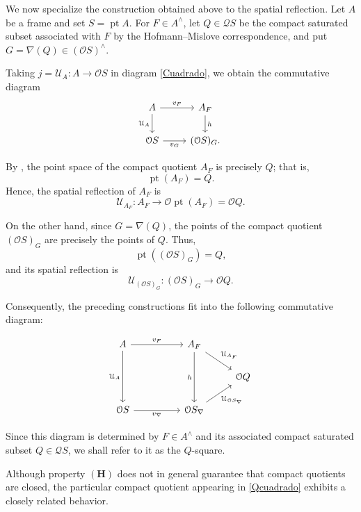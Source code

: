 \documentclass[11pt]{amsart}
\DeclareMathOperator{\pt}{pt}
\theoremstyle{plain}
\theoremstyle{definition}
\begin{document}
We now specialize the construction obtained above to the spatial reflection. Let \(A\) be a frame and set $S=\pt A$.
For \(F\in A^\wedge\), let \(Q\in\mathcal{Q}S\) be the compact
saturated subset associated with \(F\) by the Hofmann--Mislove
correspondence, and put $G=\nabla(Q)\in(\mathcal{O}S)^\wedge$.

Taking $j=\mathcal{U}_A\colon A\longrightarrow\mathcal{O}S$ in diagram \eqref{Cuadrado}, 
we obtain the commutative diagram
\[
\begin{tikzcd}
    A \arrow[r,"v_F"] \arrow[d,"\mathcal{U}_A"'] &
    A_F \arrow[d,"h"]\\
    \mathcal{O}S \arrow[r,"v_G"'] &
    (\mathcal{O}S)_G .
\end{tikzcd}
\]

By \cite[Lemma 5.7.1]{sexton2003}, the point space of the compact
quotient \(A_F\) is precisely \(Q\); that is,
\[
    \pt(A_F)=Q.
\]
Hence, the spatial reflection of \(A_F\) is
\[
    \mathcal{U}_{A_F}\colon
    A_F\longrightarrow
    \mathcal{O}\pt(A_F)=\mathcal{O}Q.
\]

On the other hand, since \(G=\nabla(Q)\), the points of the compact
quotient \((\mathcal{O}S)_G\) are precisely the points of \(Q\).
Thus,
\[
    \pt((\mathcal{O}S)_G)=Q,
\]
and its spatial reflection is
\[
    \mathcal{U}_{(\mathcal{O}S)_G}\colon
    (\mathcal{O}S)_G\longrightarrow
    \mathcal{O}Q.
\]

Consequently, the preceding constructions fit into the following
commutative diagram:

\begin{equation}\label{Qcuadrado}
\begin{tikzcd}
	A && {A_F} & \\
	&&& {\mathcal{O}Q} \\
	{\mathcal{O}S} && {\mathcal{O}S_\nabla}
	\arrow["{v_F}", from=1-1, to=1-3]
	\arrow["{\mathcal{U}_A}"', from=1-1, to=3-1]
	\arrow["{\mathcal{U}_{A_F}}", from=1-3, to=2-4]
	\arrow["h"', from=1-3, to=3-3]
	\arrow["{v_\nabla}"', from=3-1, to=3-3]
	\arrow["{\mathcal{U}_{\mathcal{O}S_\nabla}}"', from=3-3, to=2-4]
\end{tikzcd}
\end{equation}

Since this diagram is determined by \(F\in A^\wedge\) and its
associated compact saturated subset \(Q\in\mathcal{Q}S\), we shall
refer to it as the \(Q\)-square.

Although property \(\mathbf{(H)}\) does not in general guarantee that compact
quotients are closed, the particular compact quotient appearing in
\eqref{Qcuadrado} exhibits a closely related behavior.
\end{document}

